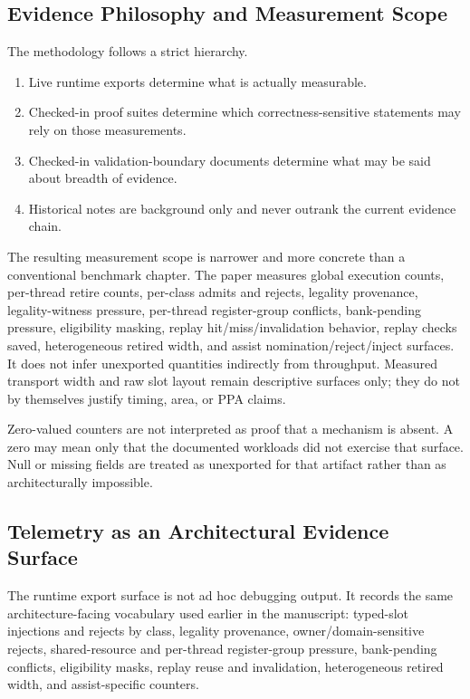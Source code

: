 \documentclass[twocolumn]{article}
\begin{document}
\subsection{Evidence Philosophy and Measurement Scope}

The methodology follows a strict hierarchy.

\begin{enumerate}
\item Live runtime exports determine what is actually measurable.
\item Checked-in proof suites determine which correctness-sensitive statements may rely on those measurements.
\item Checked-in validation-boundary documents determine what may be said about breadth of evidence.
\item Historical notes are background only and never outrank the current evidence chain.
\end{enumerate}

The resulting measurement scope is narrower and more concrete than a conventional benchmark chapter. The paper measures global execution counts, per-thread retire counts, per-class admits and rejects, legality provenance, legality-witness pressure, per-thread register-group conflicts, bank-pending pressure, eligibility masking, replay hit/miss/invalidation behavior, replay checks saved, heterogeneous retired width, and assist nomination/reject/inject surfaces. It does not infer unexported quantities indirectly from throughput. Measured transport width and raw slot layout remain descriptive surfaces only; they do not by themselves justify timing, area, or PPA claims.

Zero-valued counters are not interpreted as proof that a mechanism is absent. A zero may mean only that the documented workloads did not exercise that surface. Null or missing fields are treated as unexported for that artifact rather than as architecturally impossible.


\subsection{Telemetry as an Architectural Evidence Surface}

The runtime export surface is not ad hoc debugging output. It records the same architecture-facing vocabulary used earlier in the manuscript: typed-slot injections and rejects by class, legality provenance, owner/domain-sensitive rejects, shared-resource and per-thread register-group pressure, bank-pending conflicts, eligibility masks, replay reuse and invalidation, heterogeneous retired width, and assist-specific counters.
\end{document}
